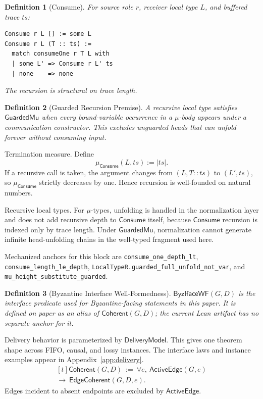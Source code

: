 \documentclass[a4paper,10pt,twocolumn,english]{article}
\numberwithin{equation}{section}
\theoremstyle{paperdef}
\newtheorem{definition}{Definition}[section]
\theoremstyle{paperplain}
\theoremstyle{paperdef}
\theoremstyle{paperremark}
\newcommand{\Coherent}{\ensuremath{\mathsf{Coherent}}}
\newcommand{\EdgeCoherent}{\ensuremath{\mathsf{EdgeCoherent}}}
\newcommand{\ActiveEdge}{\ensuremath{\mathsf{ActiveEdge}}}
\newcommand{\Consume}{\ensuremath{\mathsf{Consume}}}
\newcommand{\DeliveryModel}{\ensuremath{\mathsf{DeliveryModel}}}
\newcommand{\ByzIfaceWF}{\ensuremath{\mathsf{ByzIfaceWF}}}
\begin{document}
\begin{definition}[Consume]
	For source role $r$, receiver local type $L$, and buffered trace $ts$:
	\noindent\begin{minipage}{\columnwidth}
		\begin{lstlisting}
Consume r L [] := some L
Consume r L (T :: ts) :=
  match consumeOne r T L with
  | some L' => Consume r L' ts
  | none    => none
\end{lstlisting}
	\end{minipage}
	The recursion is structural on trace length.
\end{definition}

\begin{definition}[Guarded Recursion Premise]
	A recursive local type satisfies $\mathsf{GuardedMu}$ when every bound-variable
	occurrence in a $\mu$-body appears under a communication constructor. This
	excludes unguarded heads that can unfold forever without consuming input.
\end{definition}

Termination measure. Define
\begin{equation}
	\label{eq:p1-consume-measure}
	\mu_{\Consume}(L,ts) := |ts|.
\end{equation}
If a recursive call is taken, the argument changes from $(L,T::ts)$ to
$(L',ts)$, so $\mu_{\Consume}$ strictly decreases by one. Hence recursion is
well-founded on natural numbers.

Recursive local types. For $\mu$-types, unfolding is handled in the
normalization layer and does not add recursive depth to $\Consume$ itself,
because $\Consume$ recursion is indexed only by trace length. Under
$\mathsf{GuardedMu}$, normalization cannot generate infinite head-unfolding
chains in the well-typed fragment used here.

Mechanized anchors for this block are
\nolinkurl{consume_one_depth_lt},
\nolinkurl{consume_length_le_depth},
\nolinkurl{LocalTypeR.guarded_full_unfold_not_var}, and
\nolinkurl{mu_height_substitute_guarded}.

\begin{definition}[Byzantine Interface Well-Formedness]
	$\ByzIfaceWF(G, D)$ is the interface predicate used for Byzantine-facing statements in this paper. It is defined on paper as an alias of $\Coherent(G, D)$; the current Lean artifact has no separate anchor for it.
\end{definition}

Delivery behavior is parameterized by \DeliveryModel. This gives one theorem shape across FIFO, causal, and lossy instances. The interface laws and instance examples appear in Appendix~\ref{app:delivery}.
\begin{equation}
	\label{eq:p1-active-edge-boundary}
	\begin{aligned}[t]
		\Coherent(G,D)\ :=\ \forall e,\ \ActiveEdge(G,e)
		\\
		\to\ \EdgeCoherent(G,D,e).
	\end{aligned}
\end{equation}
Edges incident to absent endpoints are excluded by $\ActiveEdge$.
\end{document}
